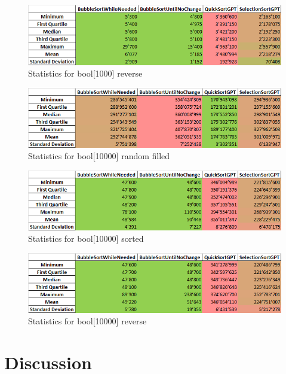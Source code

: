 \documentclass{article}
\begin{document}
    \begin{figure}[!h]
        \centering
        \includegraphics[width=0.75\linewidth]{bool1000rev-stat.png}
        \caption{Statistics for bool[1000] reverse}
        \label{fig:bool1000rev-stat}
    \end{figure}
    \begin{figure}[!h]
        \centering
        \includegraphics[width=0.75\linewidth]{bool10000rand-stat.png}
        \caption{Statistics for bool[10000] random filled}
        \label{fig:bool10000rand-stat}
    \end{figure}
    \begin{figure}[!h]
        \centering
        \includegraphics[width=0.75\linewidth]{bool10000sort-stat.png}
        \caption{Statistics for bool[10000] sorted}
        \label{fig:bool10000sort-stat}
    \end{figure}
    \begin{figure}[!h]
        \centering
        \includegraphics[width=0.75\linewidth]{bool10000rev-stat.png}
        \caption{Statistics for bool[10000] reverse}
        \label{fig:bool10000rev-stat}
    \end{figure}
    
\clearpage
\newpage

\section{Discussion}
\end{document}
